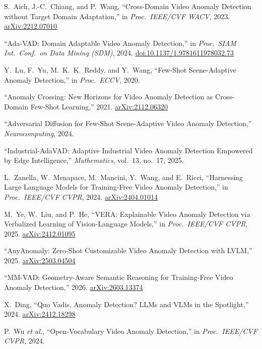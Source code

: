 \documentclass[12pt, a4paper]{article}
\begin{document}
\begin{enumerate}[label={[\arabic*]}, leftmargin=2.2em, itemsep=0.3em]

\item S.\ Aich, J.-C.\ Chiang, and P.\ Wang, ``Cross-Domain Video Anomaly
Detection without Target Domain Adaptation,'' in \textit{Proc.\ IEEE/CVF
WACV}, 2023. \href{https://arxiv.org/abs/2212.07010}{arXiv:2212.07010}

\item ``Ada-VAD: Domain Adaptable Video Anomaly Detection,'' in
\textit{Proc.\ SIAM Int.\ Conf.\ on Data Mining (SDM)}, 2024.
\href{https://epubs.siam.org/doi/10.1137/1.9781611978032.73}{doi:10.1137/1.9781611978032.73}

\item Y.\ Lu, F.\ Yu, M.\ K.\ K.\ Reddy, and Y.\ Wang, ``Few-Shot
Scene-Adaptive Anomaly Detection,'' in \textit{Proc.\ ECCV}, 2020.

\item ``Anomaly Crossing: New Horizons for Video Anomaly Detection as
Cross-Domain Few-Shot Learning,'' 2021.
\href{https://arxiv.org/abs/2112.06320}{arXiv:2112.06320}

\item ``Adversarial Diffusion for Few-Shot Scene-Adaptive Video Anomaly
Detection,'' \textit{Neurocomputing}, 2024.

\item ``Industrial-AdaVAD: Adaptive Industrial Video Anomaly Detection
Empowered by Edge Intelligence,'' \textit{Mathematics}, vol.\ 13, no.\ 17,
2025.

\item L.\ Zanella, W.\ Menapace, M.\ Mancini, Y.\ Wang, and E.\ Ricci,
``Harnessing Large Language Models for Training-Free Video Anomaly
Detection,'' in \textit{Proc.\ IEEE/CVF CVPR}, 2024.
\href{https://arxiv.org/abs/2404.01014}{arXiv:2404.01014}

\item M.\ Ye, W.\ Liu, and P.\ He, ``VERA: Explainable Video Anomaly
Detection via Verbalized Learning of Vision-Language Models,'' in
\textit{Proc.\ IEEE/CVF CVPR}, 2025.
\href{https://arxiv.org/abs/2412.01095}{arXiv:2412.01095}

\item ``AnyAnomaly: Zero-Shot Customizable Video Anomaly Detection with
LVLM,'' 2025. \href{https://arxiv.org/abs/2503.04504}{arXiv:2503.04504}

\item ``MM-VAD: Geometry-Aware Semantic Reasoning for Training-Free Video
Anomaly Detection,'' 2026.
\href{https://arxiv.org/abs/2603.13374}{arXiv:2603.13374}

\item X.\ Ding, ``Quo Vadis, Anomaly Detection? LLMs and VLMs in the
Spotlight,'' 2024.
\href{https://arxiv.org/abs/2412.18298}{arXiv:2412.18298}

\item P.\ Wu \textit{et al.}, ``Open-Vocabulary Video Anomaly Detection,''
in \textit{Proc.\ IEEE/CVF CVPR}, 2024.

\end{enumerate}
\end{document}
